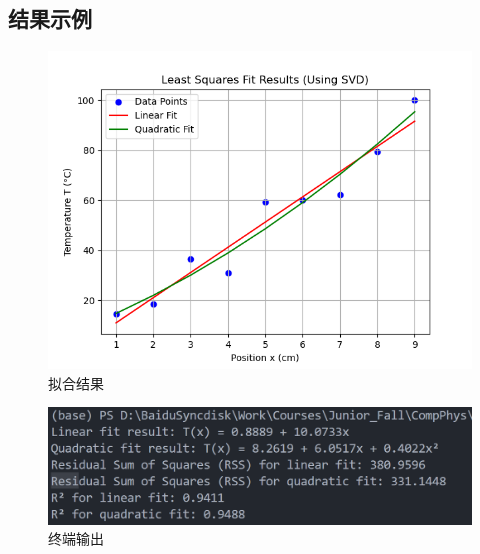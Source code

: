\subsection{结果示例}
\begin{figure}[H]
    \centering
    \includegraphics[width=1.0\textwidth]{Problem_2/figs/plot.png}
    \caption{拟合结果}
\end{figure}

\begin{figure}[H]
    \centering
    \includegraphics[width=1.0\textwidth]{Problem_2/figs/result.png}
    \caption{终端输出}
\end{figure}
